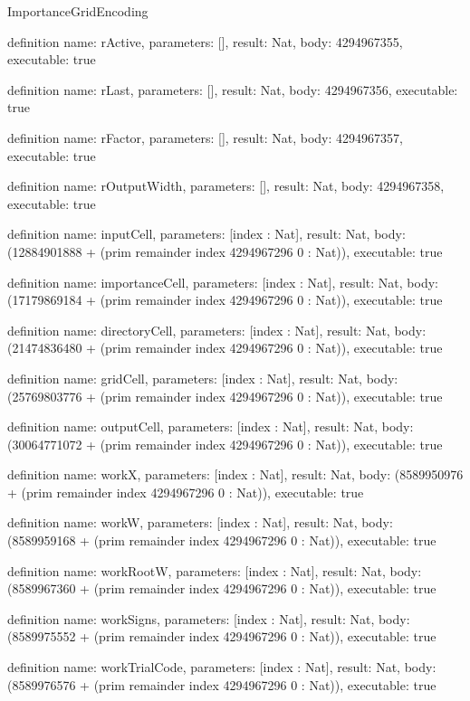 \begin{lexlean}{ImportanceGridEncoding}
\begin{semanticmodule}
definition{
  name: rActive,
  parameters: [],
  result: Nat,
  body: 4294967355,
  executable: true
}

definition{
  name: rLast,
  parameters: [],
  result: Nat,
  body: 4294967356,
  executable: true
}

definition{
  name: rFactor,
  parameters: [],
  result: Nat,
  body: 4294967357,
  executable: true
}

definition{
  name: rOutputWidth,
  parameters: [],
  result: Nat,
  body: 4294967358,
  executable: true
}

definition{
  name: inputCell,
  parameters: [index : Nat],
  result: Nat,
  body: (12884901888 + (prim remainder index 4294967296 0 : Nat)),
  executable: true
}

definition{
  name: importanceCell,
  parameters: [index : Nat],
  result: Nat,
  body: (17179869184 + (prim remainder index 4294967296 0 : Nat)),
  executable: true
}

definition{
  name: directoryCell,
  parameters: [index : Nat],
  result: Nat,
  body: (21474836480 + (prim remainder index 4294967296 0 : Nat)),
  executable: true
}

definition{
  name: gridCell,
  parameters: [index : Nat],
  result: Nat,
  body: (25769803776 + (prim remainder index 4294967296 0 : Nat)),
  executable: true
}

definition{
  name: outputCell,
  parameters: [index : Nat],
  result: Nat,
  body: (30064771072 + (prim remainder index 4294967296 0 : Nat)),
  executable: true
}

definition{
  name: workX,
  parameters: [index : Nat],
  result: Nat,
  body: (8589950976 + (prim remainder index 4294967296 0 : Nat)),
  executable: true
}

definition{
  name: workW,
  parameters: [index : Nat],
  result: Nat,
  body: (8589959168 + (prim remainder index 4294967296 0 : Nat)),
  executable: true
}

definition{
  name: workRootW,
  parameters: [index : Nat],
  result: Nat,
  body: (8589967360 + (prim remainder index 4294967296 0 : Nat)),
  executable: true
}

definition{
  name: workSigns,
  parameters: [index : Nat],
  result: Nat,
  body: (8589975552 + (prim remainder index 4294967296 0 : Nat)),
  executable: true
}

definition{
  name: workTrialCode,
  parameters: [index : Nat],
  result: Nat,
  body: (8589976576 + (prim remainder index 4294967296 0 : Nat)),
  executable: true
}


\end{semanticmodule}
\end{lexlean}
